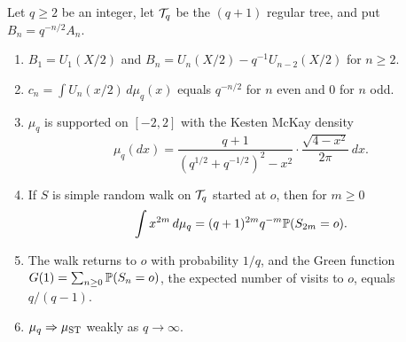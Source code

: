 \begin{theorem}\label{thm:07tree}
Let $q\ge2$ be an integer, let $\mathcal{T}_q$ be the $(q+1)$ regular tree, and put $B_n=q^{-n/2}A_n$.
\begin{enumerate}
\item $B_1=U_1(X/2)$ and $B_n=U_n(X/2)-q^{-1}U_{n-2}(X/2)$ for $n\ge2$.
\item $c_n=\int U_n(x/2)\,d\mu_q(x)$ equals $q^{-n/2}$ for $n$ even and $0$ for $n$ odd.
\item $\mu_q$ is supported on $[-2,2]$ with the Kesten McKay density
\[
\mu_q(dx)=\frac{q+1}{(q^{1/2}+q^{-1/2})^2-x^2}\cdot\frac{\sqrt{4-x^2}}{2\pi}\,dx .
\]
\item If $S$ is simple random walk on $\mathcal{T}_q$ started at $o$, then for $m\ge0$
\[
\int x^{2m}\,d\mu_q=(q+1)^{2m}q^{-m}\mathbb{P}(S_{2m}=o).
\]
\item The walk returns to $o$ with probability $1/q$, and the Green function $G(1)=\sum_{n\ge0}\mathbb{P}(S_n=o)$, the expected number of visits to $o$, equals $q/(q-1)$.
\item $\mu_q\Rightarrow\mu_{\mathrm{ST}}$ weakly as $q\to\infty$.
\end{enumerate}
\end{theorem}

